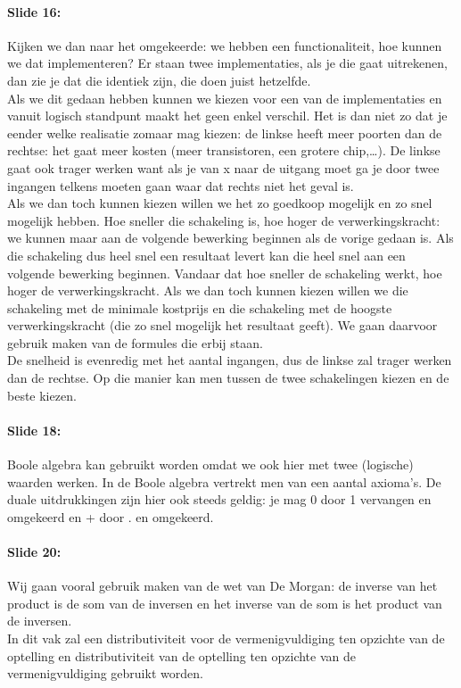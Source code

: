 \documentclass[10pt,a4paper]{book}
\begin{document}
\paragraph{Slide 16:} Kijken we dan naar het omgekeerde: we hebben een functionaliteit, hoe kunnen we dat implementeren? Er staan twee implementaties, als je die gaat uitrekenen, dan zie je dat die identiek zijn, die doen juist hetzelfde.\\
Als we dit gedaan hebben kunnen we kiezen voor een van de implementaties en vanuit logisch standpunt maakt het geen enkel verschil. Het is dan niet zo dat je eender welke realisatie zomaar mag kiezen: de linkse heeft meer poorten dan de rechtse: het gaat meer kosten (meer transistoren, een grotere chip,…). De linkse gaat ook trager werken want als je van x naar de uitgang moet ga je door twee ingangen telkens moeten gaan waar dat rechts niet het geval is.\\
Als we dan toch kunnen kiezen willen we het zo goedkoop mogelijk en zo snel mogelijk hebben. Hoe sneller die schakeling is, hoe hoger de verwerkingskracht: we kunnen maar aan de volgende bewerking beginnen als de vorige gedaan is. Als die schakeling dus heel snel een resultaat levert kan die heel snel aan een volgende bewerking beginnen. Vandaar dat hoe sneller de schakeling werkt, hoe hoger de verwerkingskracht. Als we dan toch kunnen kiezen willen we die schakeling met de minimale kostprijs en die schakeling met de hoogste verwerkingskracht (die zo snel mogelijk het resultaat geeft). We gaan daarvoor gebruik maken van de formules die erbij staan. \\
De snelheid is evenredig met het aantal ingangen, dus de linkse zal trager werken dan de rechtse. Op die manier kan men tussen de twee schakelingen kiezen en de beste kiezen.

\paragraph{Slide 18:} Boole algebra kan gebruikt worden omdat we ook hier met twee (logische) waarden werken. In de Boole algebra vertrekt men van een aantal axioma's. De duale uitdrukkingen zijn hier ook steeds geldig: je mag 0 door 1 vervangen en omgekeerd en + door . en omgekeerd.

\paragraph{Slide 20:} Wij gaan vooral gebruik maken van de wet van De Morgan: de inverse van het product is de som van de inversen en het inverse van de som is het product van de inversen. \\
In dit vak zal een distributiviteit voor de vermenigvuldiging ten opzichte van de optelling en distributiviteit van de optelling ten opzichte van de vermenigvuldiging gebruikt worden. 
\end{document}
